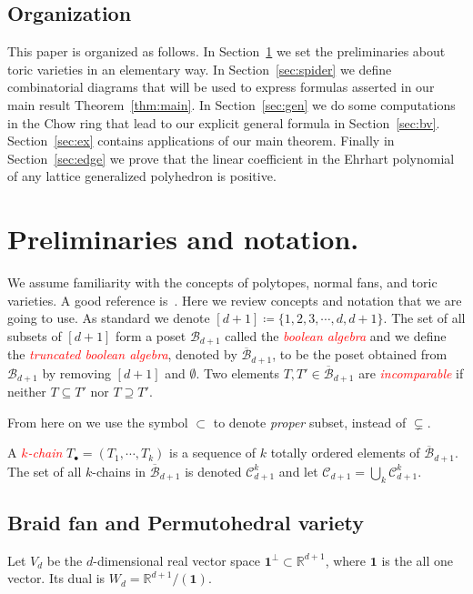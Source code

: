 \documentclass[ALCO,ThmDefs,Unicode,epreuves]{cedram}
\newcommand\R{{\mathbb R}}
\newcommand{\important}[1]{\emph{\textcolor{red}{#1}}}
\newcommand{\B}{{\mathcal B}}
\newcommand{\hB}{\overline{\mathcal B}}
\newcommand{\CC}{\mathcal{C}}
\begin{document}
\subsection{Organization}
This paper is organized as follows. In Section~\ref{sec:prelim} we set the preliminaries about toric varieties in an elementary way.
In Section~\ref{sec:spider} we define combinatorial diagrams that will be used to express formulas asserted in our main result Theorem~\ref{thm:main}. In Section~\ref{sec:gen} we do some computations in the Chow ring that lead to our explicit general formula in Section~\ref{sec:bv}. Section~\ref{sec:ex} contains applications of our main theorem. Finally in Section~\ref{sec:edge} we prove that the linear coefficient in the Ehrhart polynomial of any lattice generalized polyhedron is positive. %
\section{Preliminaries and notation.}\label{sec:prelim}
We assume familiarity with the concepts of polytopes, normal fans, and toric varieties. A good reference is~\cite{ewald}. Here we review concepts and notation that we are going to use. As standard we denote $[d+1]\coloneqq \{1,2,3,\cdots,d,d+1\}$. The set of all subsets of $[d+1]$ form a poset $\B_{d+1}$ called the \important{boolean algebra} and we define the \important{truncated boolean algebra}, denoted by $\hB_{d+1}$, to be the poset obtained from $\B_{d+1}$ by removing $[d+1]$ and $\emptyset$. Two elements $T,T'\in \hB_{d+1}$ are \important{incomparable} if neither $T\subseteq T'$ nor $T\supseteq T'$.

\begin{nota}
	From here on we use the symbol $\subset$ to denote \emph{proper} subset, instead of $\subsetneq$.
\end{nota}

A \important{$k$-chain} $T_{\bullet}=(T_1,\cdots,T_k)$ is a sequence of $k$ totally ordered elements of $\hB_{d+1}$.
The set of all $k$-chains in $\hB_{d+1}$ is denoted $\CC_{d+1}^k$ and let $\CC_{d+1}=\bigcup_k \CC_{d+1}^k$.



\subsection{Braid fan and Permutohedral variety}\label{subsec:braid}
Let $V_d$ be the $d$-dimensional real vector space $\mathbf{1}^\perp\subset \R^{d+1}$, where $\mathbf{1}$ is the all one vector. Its dual is $W_d = \R^{d+1}/(\mathbf{1})$. 
\end{document}

